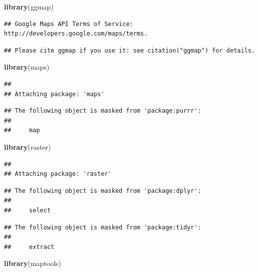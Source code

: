 \documentclass[]{article}
\newenvironment{Shaded}{\begin{snugshade}}{\end{snugshade}}
\newcommand{\KeywordTok}[1]{\textcolor[rgb]{0.13,0.29,0.53}{\textbf{{#1}}}}
\newcommand{\NormalTok}[1]{{#1}}
\begin{document}
\begin{Shaded}
\begin{Highlighting}[]
\KeywordTok{library}\NormalTok{(ggmap)}
\end{Highlighting}
\end{Shaded}

\begin{verbatim}
## Google Maps API Terms of Service: http://developers.google.com/maps/terms.
\end{verbatim}

\begin{verbatim}
## Please cite ggmap if you use it: see citation("ggmap") for details.
\end{verbatim}

\begin{Shaded}
\begin{Highlighting}[]
\KeywordTok{library}\NormalTok{(maps)}
\end{Highlighting}
\end{Shaded}

\begin{verbatim}
## 
## Attaching package: 'maps'
\end{verbatim}

\begin{verbatim}
## The following object is masked from 'package:purrr':
## 
##     map
\end{verbatim}

\begin{Shaded}
\begin{Highlighting}[]
\KeywordTok{library}\NormalTok{(raster)}
\end{Highlighting}
\end{Shaded}

\begin{verbatim}
## 
## Attaching package: 'raster'
\end{verbatim}

\begin{verbatim}
## The following object is masked from 'package:dplyr':
## 
##     select
\end{verbatim}

\begin{verbatim}
## The following object is masked from 'package:tidyr':
## 
##     extract
\end{verbatim}

\begin{Shaded}
\begin{Highlighting}[]
\KeywordTok{library}\NormalTok{(maptools)}
\end{Highlighting}
\end{Shaded}
\end{document}

